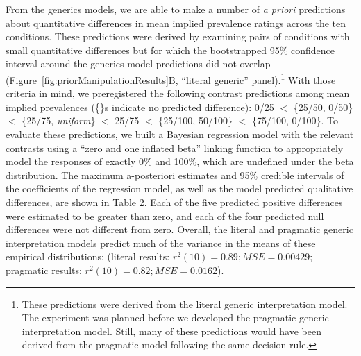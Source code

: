 \documentclass[floatsintext,doc]{apa6}
\let\rmarkdownfootnote\footnote%
\def\footnote{\protect\rmarkdownfootnote}
\begin{document}
From the generics models, we are able to make a number of \emph{a priori} predictions about quantitative differences in mean implied prevalence ratings across the ten conditions.
These predictions were derived by examining pairs of conditions with small quantitative differences but for which the bootstrapped 95\% confidence interval around the generics model predictions did not overlap (Figure~\ref{fig:priorManipulationResults}B, \enquote{literal generic} panel).\footnote{These predictions were derived from the literal generic interpretation model. The experiment was planned before we developed the pragmatic generic interpretation model. Still, many of these predictions would have been derived from the pragmatic model following the same decision rule.}
With those criteria in mind, we preregistered the following contrast predictions among mean implied prevalences (\{\}s indicate no predicted difference): 0/25 \(<\) \{25/50, 0/50\} \(<\) \{25/75, \emph{uniform}\} \(<\) 25/75 \(<\) \{25/100, 50/100\} \(<\) \{75/100, 0/100\}.
To evaluate these predictions, we built a Bayesian regression model with the relevant contrasts using a \enquote{zero and one inflated beta} linking function to appropriately model the responses of exactly 0\% and 100\%, which are undefined under the beta distribution.
The maximum a-posteriori estimates and 95\% credible intervals of the coefficients of the regression model, as well as the model predicted qualitative differences, are shown in Table 2.
Each of the five predicted positive differences were estimated to be greater than zero, and each of the four predicted null differences were not different from zero.
Overall, the literal and pragmatic generic interpretation models predict much of the variance in the means of these empirical distributions: (literal results: \(r^2(10) = 0.89; MSE = 0.00429\); pragmatic results: \(r^2(10) = 0.82; MSE = 0.0162\)).
\end{document}
